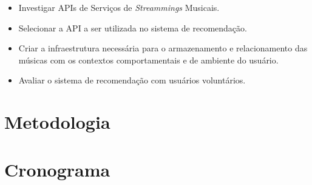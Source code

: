 \documentclass{article}
\begin{document}
\begin{itemize}
\item Investigar APIs de Serviços de \textit{Streammings} Musicais.

\item Selecionar a API a ser utilizada no sistema de recomendação.

\item Criar a infraestrutura necessária para o armazenamento e relacionamento das músicas com os contextos comportamentais e de ambiente do usuário.

\item Avaliar o sistema de recomendação com usuários voluntários.

\end{itemize}

\newpage

\section{Metodologia}

\newpage

\section{Cronograma}

\newpage


% 

\end{document}
